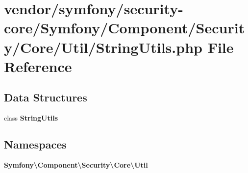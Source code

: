 \section{vendor/symfony/security-\/core/\+Symfony/\+Component/\+Security/\+Core/\+Util/\+String\+Utils.php File Reference}
\label{_string_utils_8php}
\subsection*{Data Structures}
\begin{DoxyCompactItemize}
\item 
class {\bf String\+Utils}
\end{DoxyCompactItemize}
\subsection*{Namespaces}
\begin{DoxyCompactItemize}
\item 
 {\bf Symfony\textbackslash{}\+Component\textbackslash{}\+Security\textbackslash{}\+Core\textbackslash{}\+Util}
\end{DoxyCompactItemize}
